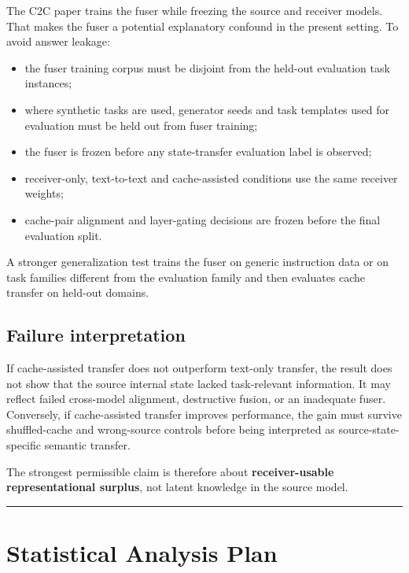The C2C paper trains the fuser while freezing the source and receiver models. That makes the fuser a potential explanatory confound in the present setting. To avoid answer leakage:

\begin{itemize}
\tightlist
\item the fuser training corpus must be disjoint from the held-out evaluation task instances;
\item where synthetic tasks are used, generator seeds and task templates used for evaluation must be held out from fuser training;
\item the fuser is frozen before any state-transfer evaluation label is observed;
\item receiver-only, text-to-text and cache-assisted conditions use the same receiver weights;
\item cache-pair alignment and layer-gating decisions are frozen before the final evaluation split.
\end{itemize}

A stronger generalization test trains the fuser on generic instruction data or on task families different from the evaluation family and then evaluates cache transfer on held-out domains.

\subsection{Failure interpretation}\label{cache-transfer-failure-interpretation}

If cache-assisted transfer does not outperform text-only transfer, the result does not show that the source internal state lacked task-relevant information. It may reflect failed cross-model alignment, destructive fusion, or an inadequate fuser. Conversely, if cache-assisted transfer improves performance, the gain must survive shuffled-cache and wrong-source controls before being interpreted as source-state-specific semantic transfer.

The strongest permissible claim is therefore about \textbf{receiver-usable representational surplus}, not latent knowledge in the source model.

\begin{center}\rule{0.5\linewidth}{0.5pt}\end{center}

\section{Statistical Analysis Plan}\label{statistical-analysis-plan}

